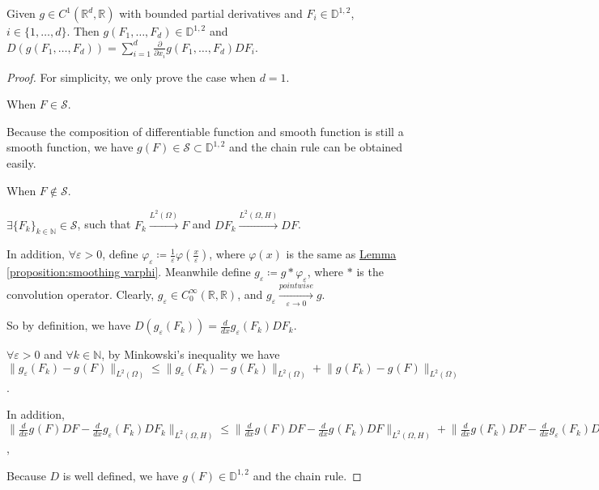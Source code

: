 \begin{theorem}
Given $g \in C^{1}(\mathbb{R}^d, \mathbb{R})$ 
with bounded partial derivatives
and $F_i \in \mathbb{D}^{1, 2}$, $i \in \{1, \dots, d\}$. 
Then $g(F_1, \dots, F_d) \in \mathbb{D}^{1, 2}$ 
and $D(g(F_1, \dots, F_d))
= \sum_{i=1}^{d} \frac{\partial}{\partial x_i}g(F_1, \dots, F_d) DF_i$. 
\end{theorem}
\setcounter{stepCounter}{1}
\begin{proof}
For simplicity, we only prove the case when $d= 1$. 

\step{} When $F \in \mathcal{S}$. 

Because the composition of differentiable function and smooth function is still a smooth function, 
we have $g(F) \in \mathcal{S} \subset \mathbb{D}^{1, 2}$ and the chain rule can be obtained easily. 

\step{} When $F \notin \mathcal{S}$. 

$\exists \{F_k\}_{k \in \mathbb{N}} \in \mathcal{S}$, 
such that $F_k \xrightarrow{L^2(\Omega)} F$ 
and $DF_k \xrightarrow{L^2(\Omega, H)} DF$. 

In addition, $\forall \varepsilon > 0$, 
define $\varphi_{\varepsilon} \coloneqq \frac{1}{\varepsilon}\varphi(\frac{x}{\varepsilon})$, 
where $\varphi(x)$ is the same as 
\hyperref[proposition:smoothing varphi]
{Lemma \ref*{proposition:smoothing varphi}}. 
Meanwhile define $g_{\varepsilon} \coloneqq g \ast \varphi_{\varepsilon}$,
where $\ast$ is the convolution operator. 
Clearly, $g_{\varepsilon} \in C_{0}^{\infty} (\mathbb{R}, \mathbb{R})$, 
and $g_{\varepsilon} \xrightarrow[\varepsilon \to 0]{pointwise} g$.

So by definition, we have 
$D(g_{\varepsilon}(F_k)) = \frac{d}{dx} g_{\varepsilon}(F_k) DF_k$. 

$\forall \varepsilon > 0$ and $\forall k \in \mathbb{N}$, 
by Minkowski's inequality
we have $\lVert g_{\varepsilon}(F_k) - g_{}(F) \rVert_{L^2(\Omega)}
\leq \lVert g_{\varepsilon}(F_k) - g_{}(F_k) \rVert_{L^2(\Omega)}
+ \lVert g_{}(F_k) - g_{}(F) \rVert_{L^2(\Omega)}$. 

In addition, 
$\lVert \frac{d}{dx}g_{}(F)DF - \frac{d}{dx} g_{\varepsilon}(F_k)DF_k \rVert_{L^2(\Omega, H)}
\leq \lVert \frac{d}{dx}g_{}(F)DF - \frac{d}{dx} g_{}(F_k)DF \rVert_{L^2(\Omega, H)}
+ \lVert \frac{d}{dx} g_{}(F_k)DF - \frac{d}{dx} g_{\varepsilon}(F_k)DF \rVert_{L^2(\Omega, H)}
+ \lVert \frac{d}{dx} g_{\varepsilon}(F_k)DF - \frac{d}{dx} g_{\varepsilon}(F_k)DF_k  \rVert_{L^2(\Omega, H)}$, 

Because $D$ is well defined, we have $g_{}(F) \in \mathbb{D}^{1, 2}$ and the chain rule. 

\end{proof}

